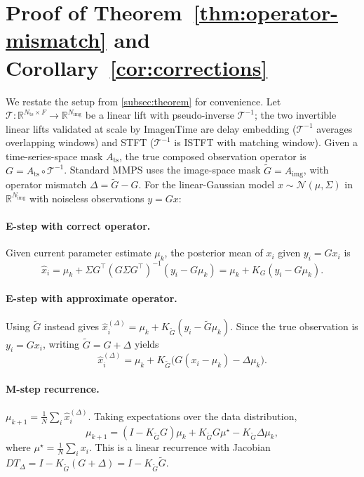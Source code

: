 \documentclass{article}
\theoremstyle{plain}
\theoremstyle{definition}
\theoremstyle{remark}
\newcommand{\tsimg}{\mathcal{T}}
\newcommand{\imgts}{\mathcal{T}^{-1}}
\newcommand{\Nts}{N_{\mathrm{ts}}}
\newcommand{\Nimg}{N_{\mathrm{img}}}
\newcommand{\Ats}{A_{\mathrm{ts}}}
\newcommand{\Aimg}{A_{\mathrm{img}}}
\begin{document}
\clearpage




\clearpage
\appendix

\section{Proof of Theorem~\ref{thm:operator-mismatch} and Corollary~\ref{cor:corrections}}
\label{app:proof}

We restate the setup from \cref{subsec:theorem} for convenience. Let $\tsimg : \mathbb{R}^{\Nts \times F} \to \mathbb{R}^{\Nimg}$ be a linear lift with pseudo-inverse $\imgts$; the two invertible linear lifts validated at scale by ImagenTime are delay embedding ($\imgts$ averages overlapping windows) and STFT ($\imgts$ is ISTFT with matching window). Given a time-series-space mask $\Ats$, the true composed observation operator is $G = \Ats \circ \imgts$. Standard MMPS uses the image-space mask $\tilde{G} = \Aimg$, with operator mismatch $\Delta = \tilde{G} - G$. For the linear-Gaussian model $x \sim \mathcal{N}(\mu, \Sigma)$ in $\mathbb{R}^{\Nimg}$ with noiseless observations $y = Gx$:

\paragraph{E-step with correct operator.}
Given current parameter estimate $\mu_k$, the posterior mean of $x_i$ given $y_i = Gx_i$ is
$$
\hat{x}_i = \mu_k + \Sigma G^\top (G \Sigma G^\top)^{-1}(y_i - G\mu_k) = \mu_k + K_G(y_i - G\mu_k).
$$

\paragraph{E-step with approximate operator.}
Using $\tilde{G}$ instead gives $\hat{x}_i^{(\Delta)} = \mu_k + K_{\tilde{G}}(y_i - \tilde{G}\mu_k)$. Since the true observation is $y_i = Gx_i$, writing $\tilde{G} = G + \Delta$ yields
$$
\hat{x}_i^{(\Delta)} = \mu_k + K_{\tilde{G}}\bigl(G(x_i - \mu_k) - \Delta \mu_k\bigr).
$$

\paragraph{M-step recurrence.}
$\mu_{k+1} = \frac{1}{N}\sum_i \hat{x}_i^{(\Delta)}$. Taking expectations over the data distribution,
$$
\mu_{k+1} = (I - K_{\tilde{G}} G)\mu_k + K_{\tilde{G}} G \mu^\star - K_{\tilde{G}} \Delta \mu_k,
$$
where $\mu^\star = \frac{1}{N}\sum_i x_i$. This is a linear recurrence with Jacobian $DT_\Delta = I - K_{\tilde{G}}(G + \Delta) = I - K_{\tilde{G}} \tilde{G}$.
\end{document}
